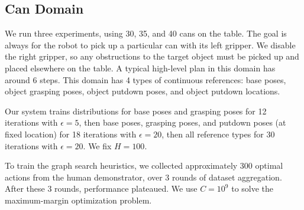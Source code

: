 \subsection{Can Domain}
We run three experiments, using 30, 35, and 40 cans on the
table.  The goal is always for the robot to pick up a particular can
with its left gripper. We disable the right gripper, so any
obstructions to the target object must be picked up and placed
elsewhere on the table. A typical high-level plan in this domain has around 6 steps.
This domain has 4 types of continuous
references: base poses, object grasping poses, object putdown poses,
and object putdown locations.

Our system trains distributions for base poses and
grasping poses for 12 iterations with $\epsilon = 5$, then base poses,
grasping poses, and putdown poses (at fixed location) for 18
iterations with $\epsilon = 20$, then all reference types for 30
iterations with $\epsilon = 20$. We fix $H = 100$.

To train the graph search heuristics, we collected approximately 300
optimal actions from the human demonstrator, over 3 rounds of dataset aggregation.
After these 3 rounds, performance plateaued. We use $C =
10^{9}$ to solve the maximum-margin optimization problem.

